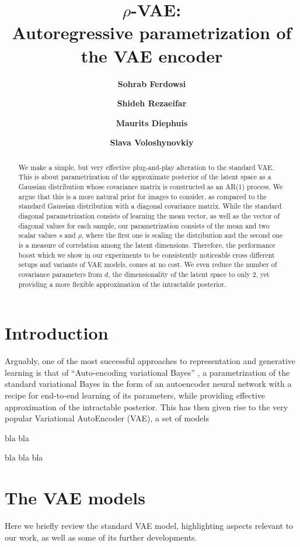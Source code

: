 \documentclass{article}
\title{$\rho$-VAE: \\Autoregressive parametrization of the VAE encoder}
\author{\textbf{Sohrab Ferdowsi}}
\author{\textbf{Shideh Rezaeifar}}
\author{\textbf{Maurits Diephuis}}
\author{\textbf{Slava Voloshynovkiy}}
\affil{
Department of Computer Science, University of Geneva, Switzerland \authorcr
  \{\tt sohrab.ferdowsi, shideh.rezaeifar, maurits.diephuis, svolos\}@unige.ch}
\begin{document}
\maketitle

\begin{abstract}
We make a simple, but very effective plug-and-play alteration to the standard VAE. This is about parametrization of the approximate posterior of the latent space as a Gaussian distribution whose covariance matrix is constructed as an AR(1) process. We argue that this is a more natural prior for images to consider, as compared to the standard Gaussian distribution with a diagonal covariance matrix. While the standard diagonal parametrization consists of learning the mean vector, as well as the vector of diagonal values for each sample, our parametrization consists of the mean and two scalar values $s$ and $\rho$, where the first one is scaling the distribution and the second one is a measure of correlation among the latent dimensions. Therefore, the performance boost which we show in our experiments to be consistently noticeable cross different setups and variants of VAE models, comes at no cost. We even reduce the number of covariance parameters from $d$, the dimensionality of the latent space to only $2$, yet providing a more flexible approximation of the intractable posterior.

\end{abstract}

\section{Introduction}
Arguably, one of the most successful approaches to representation and generative learning is that of ``Auto-encoding variational Bayes'' \cite{VAE}, a parametrization of the standard variational Bayes in the form of an autoencoder neural network with a recipe for end-to-end learning of its parameters, while providing effective approximation of the intractable posterior. This has then given rise to the very popular Variational AutoEncoder (VAE), a set of models

bla bla

bla bla bla


\section{The VAE models} \label{sec:VAE}
Here we briefly review the standard VAE model, highlighting aspects relevant to our work, as well as some of its further developments.
\end{document}
